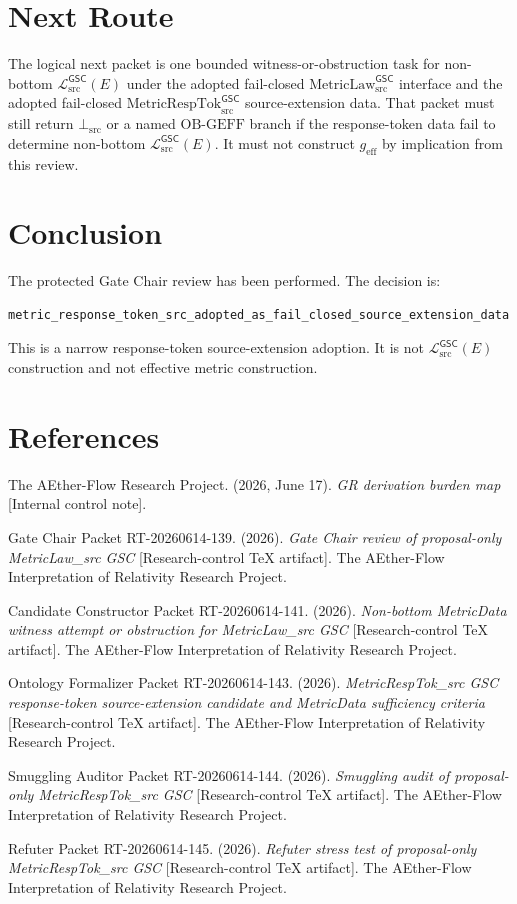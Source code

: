 \documentclass[11pt]{article}
\newcommand{\MetricLaw}{\mathrm{MetricLaw}_{\mathrm{src}}^{\mathsf{GSC}}}
\newcommand{\MetricRespTok}{\mathrm{MetricRespTok}_{\mathrm{src}}^{\mathsf{GSC}}}
\newcommand{\MetricData}{\mathcal{L}_{\mathrm{src}}^{\mathsf{GSC}}}
\newcommand{\BottomSrc}{\bot_{\mathrm{src}}}
\newcommand{\OBGEFF}{\mathrm{OB\mbox{-}GEFF}}
\newcommand{\geff}{g_{\mathrm{eff}}}
\begin{document}
\section{Next Route}

The logical next packet is one bounded witness-or-obstruction task for
non-bottom \(\MetricData(E)\) under the adopted fail-closed \(\MetricLaw\)
interface and the adopted fail-closed \(\MetricRespTok\) source-extension
data. That packet must still return \(\BottomSrc\) or a named \(\OBGEFF\)
branch if the response-token data fail to determine non-bottom
\(\MetricData(E)\). It must not construct \(\geff\) by implication from this
review.

\section{Conclusion}

The protected Gate Chair review has been performed. The decision is:

\begin{verbatim}
metric_response_token_src_adopted_as_fail_closed_source_extension_data
\end{verbatim}

This is a narrow response-token source-extension adoption. It is not
\(\MetricData(E)\) construction and not effective metric construction.

\section*{References}

The AEther-Flow Research Project. (2026, June 17). \textit{GR derivation
burden map} [Internal control note].

Gate Chair Packet RT-20260614-139. (2026). \textit{Gate Chair review of
proposal-only MetricLaw\_src GSC} [Research-control TeX artifact]. The
AEther-Flow Interpretation of Relativity Research Project.

Candidate Constructor Packet RT-20260614-141. (2026). \textit{Non-bottom
MetricData witness attempt or obstruction for MetricLaw\_src GSC}
[Research-control TeX artifact]. The AEther-Flow Interpretation of Relativity
Research Project.

Ontology Formalizer Packet RT-20260614-143. (2026). \textit{MetricRespTok\_src
GSC response-token source-extension candidate and MetricData sufficiency
criteria} [Research-control TeX artifact]. The AEther-Flow Interpretation of
Relativity Research Project.

Smuggling Auditor Packet RT-20260614-144. (2026). \textit{Smuggling audit of
proposal-only MetricRespTok\_src GSC} [Research-control TeX artifact]. The
AEther-Flow Interpretation of Relativity Research Project.

Refuter Packet RT-20260614-145. (2026). \textit{Refuter stress test of
proposal-only MetricRespTok\_src GSC} [Research-control TeX artifact]. The
AEther-Flow Interpretation of Relativity Research Project.
\end{document}
